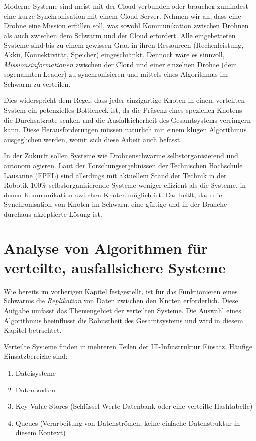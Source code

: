 Moderne Systeme sind meist mit der Cloud verbunden oder brauchen zumindest eine kurze Synchronisation mit einem Cloud-Server. Nehmen wir an, dass eine Drohne eine Mission erfüllen soll, was sowohl Kommunikation zwischen Drohnen als auch zwischen dem Schwarm und der Cloud erfordert. Alle eingebetteten Systeme sind bis zu einem gewissen Grad in ihren Ressourcen (Rechenleistung, Akku, Konnektivität, Speicher) eingeschränkt. Dennoch wäre es sinnvoll, \textit{Missionsinformationen} zwischen der Cloud und einer einzelnen Drohne (dem sogenannten Leader) zu synchronisieren und mittels eines Algorithmus im Schwarm zu verteilen.

Dies widerspricht dem Regel, dass jeder einzigartige Knoten in einem verteilten System ein potenzielles Bottleneck ist, da die Präsenz eines speziellen Knotens die Durchsatzrate senken und die Ausfallsicherheit des Gesamtsystems verringern kann. Diese Herausforderungen müssen natürlich mit einem klugen Algorithmus ausgeglichen werden, womit sich diese Arbeit auch befasst.

In der Zukunft sollen Systeme wie Drohnenschwärme selbstorganisierend und autonom agieren. Laut den Forschungsergebnissen der Technischen Hochschule Lausanne (EPFL) sind allerdings mit aktuellem Stand der Technik in der Robotik 100\% selbstorganisierende Systeme weniger effizient als die Systeme, in denen Kommunikation zwischen Knoten möglich ist. Das heißt, dass die Synchronisation von Knoten im Schwarm eine gültige und in der Branche durchaus akzeptierte Lösung ist.

\section{Analyse von Algorithmen für verteilte, ausfallsichere Systeme}

Wie bereits im vorherigen Kapitel festgestellt, ist für das Funktionieren eines Schwarms die \textit{Replikation} von Daten zwischen den Knoten erforderlich. Diese Aufgabe umfasst das Themengebiet der verteilten Systeme. Die Auswahl eines Algorithmus beeinflusst die Robustheit des Gesamtsystems und wird in diesem Kapitel betrachtet.

Verteilte Systeme finden in mehreren Teilen der IT-Infrastruktur Einsatz. Häufige Einsatzbereiche sind:

\begin{enumerate}
	\item Dateisysteme
	
	\item Datenbanken
	
	\item Key-Value Stores (Schlüssel-Werte-Datenbank oder eine verteilte Hashtabelle)
	
	\item Queues (Verarbeitung von Datenströmen, keine einfache Datenstruktur in diesem Kontext)
\end{enumerate}

